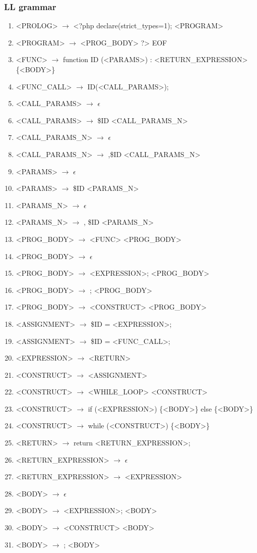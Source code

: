 \documentclass{article}
\begin{document}
\subsubsection{LL grammar}
\begin{enumerate}
    \item <PROLOG> $\rightarrow$ <?php declare(strict\_types=1);  <PROGRAM>
    \item <PROGRAM> $\rightarrow$ <PROG\_BODY>  ?> EOF
    \item <FUNC> $\rightarrow$ function ID (<PARAMS>) : <RETURN\_EXPRESSION> \{<BODY>\}
    \item <FUNC\_CALL> $\rightarrow$ ID(<CALL\_PARAMS>);
    \item <CALL\_PARAMS> $\rightarrow$ $\epsilon$
    \item <CALL\_PARAMS> $\rightarrow$ \$ID <CALL\_PARAMS\_N>
    \item <CALL\_PARAMS\_N> $\rightarrow$ $\epsilon$
    \item <CALL\_PARAMS\_N> $\rightarrow$ ,\$ID <CALL\_PARAMS\_N>
    \item <PARAMS> $\rightarrow$ $\epsilon$
    \item <PARAMS> $\rightarrow$ \$ID <PARAMS\_N>
    \item <PARAMS\_N> $\rightarrow$ $\epsilon$
    \item <PARAMS\_N> $\rightarrow$ , \$ID <PARAMS\_N>
    \item <PROG\_BODY> $\rightarrow$ <FUNC> <PROG\_BODY>
    \item <PROG\_BODY> $\rightarrow$ $\epsilon$
    \item <PROG\_BODY> $\rightarrow$ <EXPRESSION>; <PROG\_BODY>
    \item <PROG\_BODY> $\rightarrow$ ; <PROG\_BODY>
    \item <PROG\_BODY> $\rightarrow$ <CONSTRUCT> <PROG\_BODY>
    \item <ASSIGNMENT> $\rightarrow$ \$ID = <EXPRESSION>;
    \item <ASSIGNMENT> $\rightarrow$ \$ID = <FUNC\_CALL>;
    \item <EXPRESSION> $\rightarrow$ <RETURN>
    \item <CONSTRUCT> $\rightarrow$ <ASSIGNMENT>
    \item <CONSTRUCT> $\rightarrow$ <WHILE\_LOOP> <CONSTRUCT>
    \item <CONSTRUCT> $\rightarrow$ if (<EXPRESSION>) \{<BODY>\} else \{<BODY>\}
    \item <CONSTRUCT> $\rightarrow$ while (<CONSTRUCT>) \{<BODY>\}
    \item <RETURN> $\rightarrow$ return <RETURN\_EXPRESSION>;
    \item <RETURN\_EXPRESSION> $\rightarrow$ $\epsilon$
    \item <RETURN\_EXPRESSION> $\rightarrow$ <EXPRESSION>
    \item <BODY> $\rightarrow$ $\epsilon$
    \item <BODY> $\rightarrow$ <EXPRESSION>; <BODY>
    \item <BODY> $\rightarrow$ <CONSTRUCT> <BODY>
    \item <BODY> $\rightarrow$ ; <BODY>
\end{enumerate}
\end{document}
